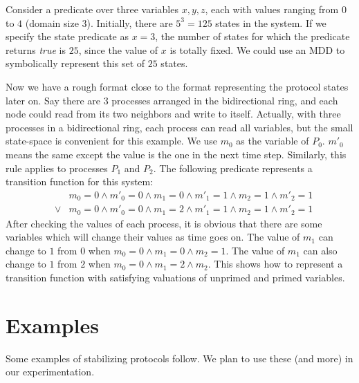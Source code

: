 Consider a predicate over three variables $x, y, z$, each with values ranging from $0$ to $4$ (domain size 3). Initially, there are $5^3 = 125$ states in the system. If we specify the state predicate as $x=3$, the number of states for which the predicate returns {\it true} is $25$, since the value of $x$ is totally fixed. We could use an MDD to symbolically represent this set of $25$ states.

Now we have a rough format close to the format representing the protocol states later on. Say there are 3 processes arranged in the bidirectional ring, and each node could read from its two neighbors and write to itself. Actually, with three processes in a bidirectional ring, each process can read all variables, but the small state-space is convenient for this example. We use $m_0$ as the variable of $P_0$. $m'_0$ means the same except the value is the one in the next time step. Similarly, this rule applies to processes $P_1$ and $P_2$. The following predicate represents a transition function for this system:
\begin{eqnarray*}
 & & m_0 = 0 \wedge m'_0 = 0 \wedge m_1 = 0 \wedge m'_1 = 1 \wedge m_2 = 1 \wedge m'_2 = 1 \\
 & \vee & m_0 = 0 \wedge m'_0 = 0 \wedge m_1 = 2 \wedge m'_1 = 1 \wedge m_2 = 1 \wedge m'_2 = 1
\end{eqnarray*}
After checking the values of each process, it is obvious that there are some variables which will change their values as time goes on. The value of $m_1$ can change to $1$ from $0$ when $m_0 = 0 \wedge m_1 = 0 \wedge m_2 = 1$. The value of $m_1$ can also change to $1$ from $2$ when $m_0 = 0 \wedge m_1 = 2 \wedge m_2$. This shows how to represent a transition function with satisfying valuations of unprimed and primed variables.


\section{Examples}
Some examples of stabilizing protocols follow.
We plan to use these (and more) in our experimentation.

